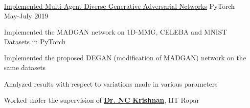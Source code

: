 

\begin{cventries}



  \projects
  {} %
  {\href{https://github.com/vinx-2105/MADGAN}{Implemented Multi-Agent Diverse Generative Adversarial Networks}} %
  {PyTorch} %
  {May-July 2019} %
  {
    \begin{cvitems} %
      \item {Implemented the MADGAN network on 1D-MMG, CELEBA and MNIST Datasets in PyTorch}
      \item {Implemented the proposed DEGAN (modification of MADGAN) network on the same datasets}
      \item {Analyzed results with respect to variations made in various parameters}
      \item {Worked under the supervision of \href{http://www.iitrpr.ac.in/cse/ckn}{\textbf{Dr. NC Krishnan}}, IIT Ropar}
    \end{cvitems}
  }



\end{cventries}
